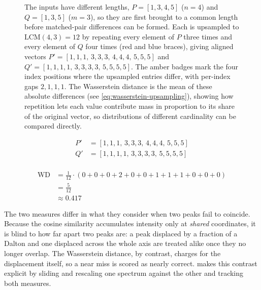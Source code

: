 \begin{figure}[H]
    \centering
    \resizebox{\textwidth}{!}{
        
    }
    \caption[Wasserstein Upsampling Illustration]{
        The inputs have different lengths, $P = [1,3,4,5]$ ($n=4$) and $Q = [1,3,5]$ ($m=3$), so they are first brought to a common length before matched-pair differences can be formed.
        Each is upsampled to $\mathrm{LCM}(4,3) = 12$ by repeating every element of $P$ three times and every element of $Q$ four times (red and blue braces), giving aligned vectors $P' = [1,1,1,\,3,3,3,\,4,4,4,\,5,5,5]$ and $Q' = [1,1,1,1,\,3,3,3,3,\,5,5,5,5]$.
        The amber badges mark the four index positions where the upsampled entries differ, with per-index gaps $2,1,1,1$.
        The Wasserstein distance is the mean of these absolute differences (see \cref{eq:wasserstein-upsampling}),
        showing how repetition lets each value contribute mass in proportion to its share of the original vector, so distributions of different cardinality can be compared directly.
    }
    \label{fig:wasserstein-upsampling-illustration}
\end{figure}

\begin{align*}
    P' &= [1,1,1,\,3,3,3,\,4,4,4,\,5,5,5]\\
    Q' &= [1,1,1,1,\,3,3,3,3,\,5,5,5,5]\\
\end{align*}

\begin{align}
    \label{eq:wasserstein-upsampling}
    \mathrm{WD} &= \tfrac{1}{12}\cdot(0+0+0+2+0+0+1+1+1+0+0+0) \\
                &= \tfrac{5}{12} \nonumber \\
                &\approx 0.417 \nonumber
\end{align}

The two measures differ in what they consider when two peaks fail to coincide.
Because the cosine similarity accumulates intensity only at \emph{shared} coordinates, it is blind to how far apart two peaks are: a peak displaced by a fraction of a Dalton and one displaced across the whole axis are treated alike once they no longer overlap.
The Wasserstein distance, by contrast, charges for the displacement itself, so a near miss is scored as nearly correct.
 makes this contrast explicit by sliding and rescaling one spectrum against the other and tracking both measures.

